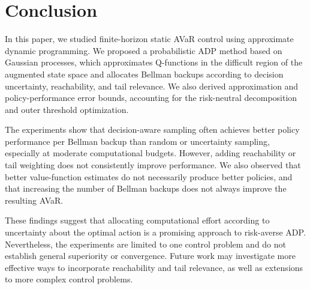 \section{Conclusion}
\label{sec:conclusion}

In this paper, we studied finite-horizon static AVaR control using approximate dynamic programming. We proposed a probabilistic ADP method based on Gaussian processes, which approximates Q-functions in the difficult region of the augmented state space and allocates Bellman backups according to decision uncertainty, reachability, and tail relevance. We also derived approximation and policy-performance error bounds, accounting for the risk-neutral decomposition and outer threshold optimization.

The experiments show that decision-aware sampling often achieves better policy performance per Bellman backup than random or uncertainty sampling, especially at moderate computational budgets. However, adding reachability or tail weighting does not consistently improve performance. We also observed that better value-function estimates do not necessarily produce better policies, and that increasing the number of Bellman backups does not always improve the resulting AVaR.

These findings suggest that allocating computational effort according to uncertainty about the optimal action is a promising approach to risk-averse ADP. Nevertheless, the experiments are limited to one control problem and do not establish general superiority or convergence. Future work may investigate more effective ways to incorporate reachability and tail relevance, as well as extensions to more complex control problems.